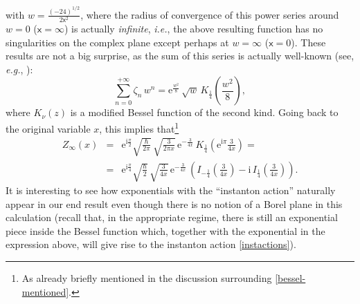 \documentclass[11pt,a4paper]{article}
\newcommand{\rme}{{\mathrm{e}}}
\newcommand{\rmi}{{\mathrm{i}}}
\begin{document}
%
\noindent
with $w = \frac{\left(-24\right)^{1/2}}{2\mathsf{x}^2}$, where the radius of convergence of this power series around $w=0$ ($\mathsf{x}=\infty$) is actually \textit{infinite}, \textit{i.e.}, the above resulting function has no singularities on the complex plane except perhaps at $w=\infty$ ($\mathsf{x}=0$). These results are not a big surprise, as the sum of this series is actually well-known (see, \textit{e.g.}, \cite{olbc10}):
%
\begin{equation}
\sum_{n=0}^{+\infty} \zeta_n\, w^n = \rme^{\frac{w^2}{8}}\, \sqrt{w}\, K_{\frac{1}{4}} \left( \frac{w^2}{8} \right),
\end{equation}
%
\noindent
where $K_{\nu} (z)$ is a modified Bessel function of the second kind. Going back to the original variable $x$, this implies that\footnote{As already briefly mentioned in the discussion surrounding \eqref{bessel-mentioned}.}
%
\begin{eqnarray}
Z_{\infty} (x) &=& \rme^{\rmi\frac{\pi}{2}} \sqrt{\frac{\hbar}{2\pi}}\, \sqrt{\frac{3}{2\pi x}}\, \rme^{-\frac{3}{4x}}\, K_{\frac{1}{4}} \left(\rme^{\rmi\pi} \frac{3}{4x} \right) = \\
&=& \rme^{\rmi\frac{\pi}{4}} \sqrt{\frac{\hbar}{2}}\, \sqrt{\frac{3}{4x}}\, \rme^{-\frac{3}{4x}}\, \left( I_{-\frac{1}{4}} \left( \frac{3}{4x} \right) - \rmi\, I_{\frac{1}{4}} \left( \frac{3}{4x} \right) \right).
\label{eq:Zinf-as-S0p}
\end{eqnarray}
%
\noindent
It is interesting to see how exponentials with the ``instanton action'' naturally appear in our end result even though there is no notion of a Borel plane in this calculation (recall that, in the appropriate regime, there is still an exponential piece inside the Bessel function which, together with the exponential in the expression above, will give rise to the instanton action \eqref{instactions}).
\end{document}
